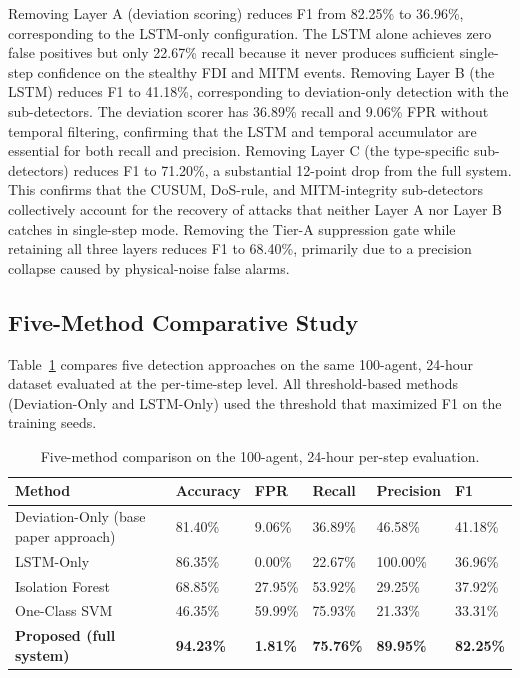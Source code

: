 Removing Layer A (deviation scoring) reduces F1 from 82.25\% to 36.96\%, corresponding to the
LSTM-only configuration. The LSTM alone achieves zero false positives but only 22.67\% recall
because it never produces sufficient single-step confidence on the stealthy FDI and MITM events.
Removing Layer B (the LSTM) reduces F1 to 41.18\%, corresponding to deviation-only detection with
the sub-detectors. The deviation scorer has 36.89\% recall and 9.06\% FPR without temporal
filtering, confirming that the LSTM and temporal accumulator are essential for both recall and
precision. Removing Layer C (the type-specific sub-detectors) reduces F1 to 71.20\%, a substantial
12-point drop from the full system. This confirms that the CUSUM, DoS-rule, and MITM-integrity
sub-detectors collectively account for the recovery of attacks that neither Layer A nor Layer B
catches in single-step mode. Removing the Tier-A suppression gate while retaining all three layers
reduces F1 to 68.40\%, primarily due to a precision collapse caused by physical-noise false alarms.

\subsection{Five-Method Comparative Study}
\label{sec:fivemethod}

Table~\ref{tab:fivemethod} compares five detection approaches on the same 100-agent, 24-hour
dataset evaluated at the per-time-step level. All threshold-based methods (Deviation-Only and
LSTM-Only) used the threshold that maximized F1 on the training seeds.

\begin{table}[htbp]
\centering
\caption{Five-method comparison on the 100-agent, 24-hour per-step evaluation.}
\label{tab:fivemethod}
\begin{tabular}{@{}llllll@{}}
\hline
\textbf{Method} & \textbf{Accuracy} & \textbf{FPR} & \textbf{Recall} & \textbf{Precision} & \textbf{F1} \\
\hline
Deviation-Only (base paper approach) & 81.40\% & 9.06\%  & 36.89\%  & 46.58\%  & 41.18\% \\
LSTM-Only                            & 86.35\% & 0.00\%  & 22.67\%  & 100.00\% & 36.96\% \\
Isolation Forest                     & 68.85\% & 27.95\% & 53.92\%  & 29.25\%  & 37.92\% \\
One-Class SVM                        & 46.35\% & 59.99\% & 75.93\%  & 21.33\%  & 33.31\% \\
\textbf{Proposed (full system)}      & \textbf{94.23\%} & \textbf{1.81\%} & \textbf{75.76\%} & \textbf{89.95\%} & \textbf{82.25\%} \\
\hline
\end{tabular}
\end{table}

